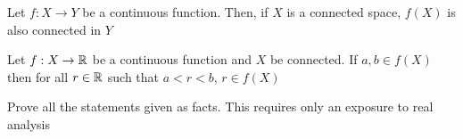 \begin{fact}
    Let $f:X \to Y$ be a continuous function. Then, if $X$ is a connected space, $f(X)$ is also connected in $Y$
\end{fact}

\begin{fact}
    Let $f:X \to \mathbb R$ be a continuous function and $X$ be connected. If $a, b \in f(X)$ then for all $r\in \mathbb R$ such that $a<r<b$, $r\in f(X)$
\end{fact}


    Prove all the statements given as facts. This requires only an exposure to real analysis

